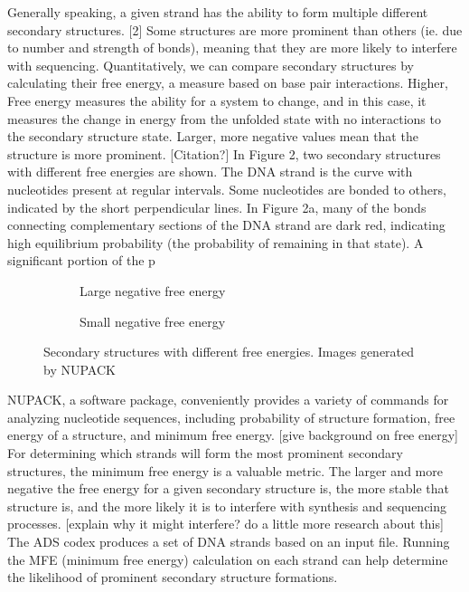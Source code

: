 \documentclass{article}
\begin{document}
Generally speaking, a given strand has the ability to form multiple different secondary structures. [2] Some structures are more prominent than others (ie. due to number and strength of bonds), meaning that they are more likely to interfere with sequencing. Quantitatively, we can compare secondary structures by calculating their free energy, a measure based on base pair interactions. Higher, Free energy measures the ability for a system to change, and in this case, it measures the change in energy from the unfolded state with no interactions to the secondary structure state. Larger, more negative values mean that the structure is more prominent. [Citation?] In Figure 2, two secondary structures with different free energies are shown. The DNA strand is the curve with nucleotides present at regular intervals. Some nucleotides are bonded to others, indicated by the short perpendicular lines. In Figure 2a, many of the bonds connecting complementary sections of the DNA strand are dark red, indicating high equilibrium probability (the probability of remaining in that state). A significant portion of the p     

\begin{figure}[!h]
\centering
\begin{subfigure}{.5\textwidth}
  \centering
  
  \caption{Large negative free energy}
  \label{fig:sub1}
\end{subfigure}%
\begin{subfigure}{.5\textwidth}
  \centering
  
  \caption{Small negative free energy}
  \label{fig:sub2}
\end{subfigure}
\caption{Secondary structures with different free energies. Images generated by NUPACK}
\label{fig:test}
\end{figure}

NUPACK, a software package, conveniently provides a variety of commands for analyzing nucleotide sequences, including probability of structure formation, free energy of a structure, and minimum free energy. [give background on free energy] For determining which strands will form the most prominent secondary structures, the minimum free energy is a valuable metric. The larger and more negative the free energy for a given secondary structure is, the more stable that structure is, and the more likely it is to interfere with synthesis and sequencing processes. [explain why it might interfere? do a little more research about this] The ADS codex produces a set of DNA strands based on an input file. Running the MFE (minimum free energy) calculation on each strand can help determine the likelihood of prominent secondary structure formations.
\end{document}
